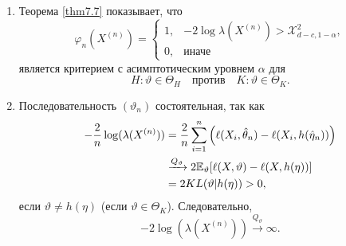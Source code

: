 \begin{rmrk} \
	\begin{enumerate}
		\item Теорема \ref{thm7.7} показывает, что
		\[ \varphi_n (X^{(n)}) =
		\left \{
		\begin{array}{cl}
		1, & -2\log\lambda(X^{(n)}) > \mathcal{X}_{d-c, 1-\alpha}^2, \\
		0, & \text{иначе}
		\end{array}
		\right.
		\]
		является критерием с асимптотическим уровнем $\alpha$ для
		\[H:\vartheta \in \Theta_H \quad \text{против} \quad K:\vartheta \in \Theta_K. \]
		\item Последовательность $(\vartheta_n)$ состоятельная, так как
		\[ 
		\begin{aligned}
		-\frac{2}{n} \log (\lambda(X^{(n)})) & = \frac{2}{n} \sum_{i=1}^{n} \Big( \ell(X_i, \hat{\theta}_n) - \ell(X_i, h(\hat{\eta}_n)) \Big) \\
		& \xrightarrow{Q_\vartheta} 2 \mathbb{E}_\vartheta[\ell(X,\vartheta) - \ell(X, h(\eta))] \\
		& = 2 KL(\vartheta | h(\eta)) > 0,
		\end{aligned}
		\]
		если $\vartheta \neq h(\eta)$ (если $\vartheta \in \Theta_K$). Следовательно,
		\[ -2\log(\lambda(X^{(n)}))\xrightarrow{Q_\vartheta} \infty.  \]
	\end{enumerate}
\end{rmrk}

